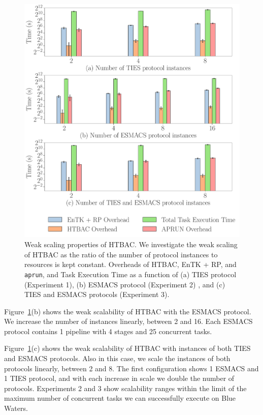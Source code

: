 \begin{figure}
  \centering
    \includegraphics[width=\columnwidth]{figures/ws_all_base2.pdf}
    \caption{Weak scaling properties of HTBAC. We investigate the weak
    scaling of HTBAC as the ratio of the number of protocol instances to
    resources is kept constant. Overheads of HTBAC, EnTK + RP, and
    \texttt{aprun}, and Task Execution Time as a function of (a) TIES
    protocol (Experiment 1), (b) ESMACS protocol (Experiment 2) , and (c)
    TIES and ESMACS protocols (Experiment 3).}
\label{fig:ws}
\end{figure}

Figure~\ref{fig:ws}(b) shows the weak scalability of HTBAC with the ESMACS
protocol. We increase the number of instances linearly, between 2 and 16.
Each ESMACS protocol contains 1 pipeline with 4 stages and 25 concurrent
tasks.

Figure~\ref{fig:ws}(c) shows the weak scalability of HTBAC with instances of
both TIES and ESMACS protocols. Also in this case, we scale the instances of
both protocols linearly, between 2 and 8. The first configuration shows 1
ESMACS and 1 TIES protocol, and with each increase in scale we double the
number of protocols. Experiments 2 and 3 show scalability ranges within the
limit of the maximum number of concurrent tasks we can successfully execute
on Blue Waters. 

